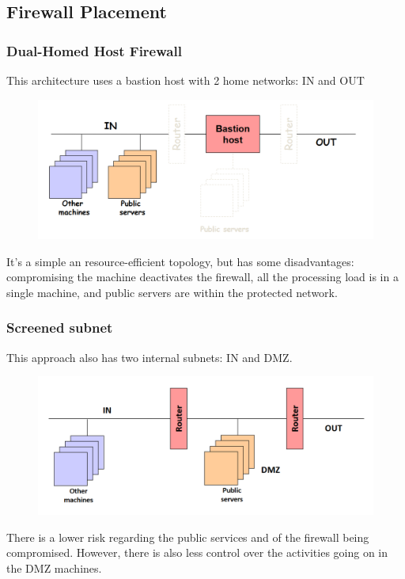\documentclass[10pt,a4paper]{report}
\begin{document}
\subsection{Firewall Placement}
\subsubsection{Dual-Homed Host Firewall}
This architecture uses a bastion host with 2 home networks: IN and OUT
\begin{figure}[H]
\centering
\includegraphics[scale=0.45]{16.png}
\end{figure}
It's a simple an resource-efficient topology, but has some disadvantages: compromising the machine deactivates the firewall, all the processing load is in a single machine, and public servers are within the protected network.
\subsubsection{Screened subnet}
This approach also has two internal subnets: IN and DMZ.
\begin{figure}[H]
\centering
\includegraphics[scale=0.45]{17.png}
\end{figure}
There is a lower risk regarding the public services and of the firewall being compromised. However, there is also less control over the activities going on in the DMZ machines.
\end{document}

